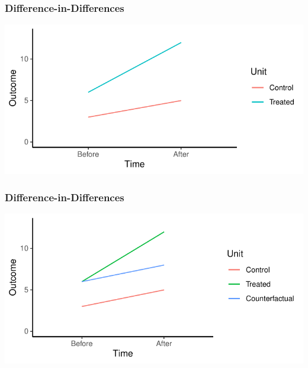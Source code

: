 \documentclass[xcolor=x11names,compress]{beamer}\usepackage[]{graphicx}\usepackage[]{color}
\makeatletter
\def\maxwidth{ %
  \ifdim\Gin@nat@width>\linewidth
    \linewidth
  \else
    \Gin@nat@width
  \fi
}
\newenvironment{knitrout}{}{} %
\renewcommand{\(}{\begin{columns}}
\renewcommand{\)}{\end{columns}}
\newcommand{\<}[1]{\begin{column}{#1}}
\renewcommand{\>}{\end{column}}
\makeatother
\begin{document}
\begin{frame}
\frametitle{Difference-in-Differences}
\begin{knitrout}
\color{fgcolor}
\includegraphics[width=\maxwidth]{figure/DinD_chart1b-1} 

\end{knitrout}
\end{frame}

\begin{frame}
\frametitle{Difference-in-Differences}
\begin{knitrout}
\color{fgcolor}
\includegraphics[width=\maxwidth]{figure/DinD_chart1c-1} 

\end{knitrout}
\end{frame}
\end{document}
